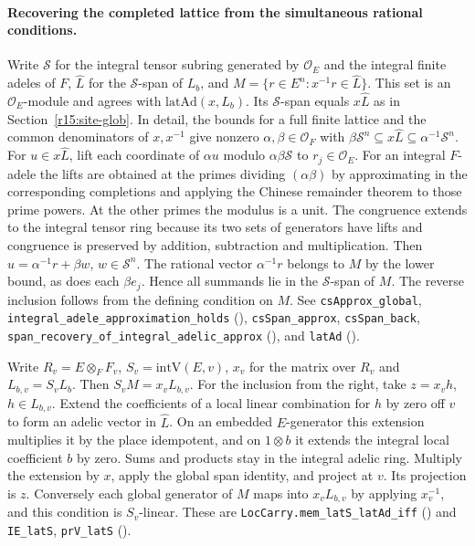 \paragraph{Recovering the completed lattice from the simultaneous rational conditions.}
\label{r15:span-place}
Write $\mathcal S$ for the integral tensor subring generated by
$\mathcal O_E$ and the integral finite adeles of $F$, $\widehat L$ for
the $\mathcal S$-span of $L_b$, and $M=\{r\in E^n:x^{-1}r\in\widehat L\}$.
This set is an $\mathcal O_E$-module and agrees with $\mathrm{latAd}(x,L_b)$.
Its $\mathcal S$-span equals $x\widehat L$ as in
Section~\ref{r15:site-glob}. In detail, the bounds for a full finite
lattice and the common denominators of $x,x^{-1}$ give nonzero
$\alpha,\beta\in\mathcal O_F$ with
$\beta\mathcal S^n\subseteq x\widehat L\subseteq\alpha^{-1}\mathcal S^n$.
For $u\in x\widehat L$, lift each coordinate of $\alpha u$ modulo
$\alpha\beta\mathcal S$ to $r_j\in\mathcal O_E$. For an integral
$F$-adele the lifts are obtained at the primes dividing $(\alpha\beta)$ by
approximating in the corresponding completions and applying the Chinese
remainder theorem to those prime powers. At the other primes the modulus
is a unit. The congruence extends to the integral tensor ring because
its two sets of generators have lifts and congruence is preserved by
addition, subtraction and multiplication. Then
$u=\alpha^{-1}r+\beta w$, $w\in\mathcal S^n$. The rational vector
$\alpha^{-1}r$ belongs to $M$ by the lower bound, as does each
$\beta e_j$. Hence all summands lie in the $\mathcal S$-span of $M$.
The reverse inclusion follows from the defining condition on $M$.
See \nolinkurl{csApprox_global}, \nolinkurl{integral_adele_approximation_holds}
(), \nolinkurl{csSpan_approx},
\nolinkurl{csSpan_back}, \nolinkurl{span_recovery_of_integral_adelic_approx}
(), and
\nolinkurl{latAd} ().

Write $R_v=E\otimes_F F_v$, $S_v=\mathrm{intV}(E,v)$, $x_v$ for
the matrix over $R_v$ and $L_{b,v}=S_v L_b$. Then
$S_vM=x_v L_{b,v}$. For the inclusion from the right,
take $z=x_v h$, $h\in L_{b,v}$. Extend the coefficients of a local
linear combination for $h$ by zero off $v$ to form an adelic vector in
$\widehat L$. On an embedded $E$-generator this extension multiplies it by the place
idempotent, and on $1\otimes b$ it extends the integral local coefficient
$b$ by zero. Sums and products stay in the integral adelic ring. Multiply the
extension by $x$, apply the global span identity, and project at $v$.
Its projection is $z$. Conversely each global generator of $M$ maps into
$x_v L_{b,v}$ by applying $x_v^{-1}$, and this condition is $S_v$-linear.
These are \nolinkurl{LocCarry.mem_latS_latAd_iff}
() and
\nolinkurl{IE_latS}, \nolinkurl{prV_latS} ().

